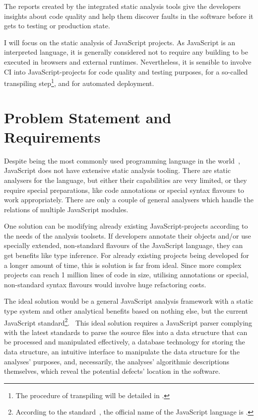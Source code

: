 The reports created by the integrated static analysis tools give the developers insights about code quality and help them discover faults in the software before it gets to testing or production state.

I will focus on the static analysis of JavaScript projects. As JavaScript is an interpreted language, it is generally considered not to require any building to be executed in browsers and external runtimes. Nevertheless, it is sensible to involve CI into JavaScript-projects for code quality and testing purposes, for a so-called transpiling step\footnote{The procedure of transpiling will be detailed in .}, and for automated deployment.


\section{Problem Statement and Requirements}

Despite being the most commonly used programming language in the world~\cite{javascriptstackoverflow}, JavaScript does not have extensive static analysis tooling. There are static analysers for the language, but either their capabilities are very limited, or they require special preparations, like code annotations or special syntax flavours to work appropriately. There are only a couple of general analysers which handle the relations of multiple JavaScript modules.

One solution can be modifying already existing JavaScript-projects according to the needs of the analysis toolsets. If developers annotate their objects and/or use specially extended, non-standard flavours of the JavaScript language, they can get benefits like type inference. For already existing projects being developed for a longer amount of time, this is solution is far from ideal. Since more complex projects can reach 1 million lines of code in size, utilising annotations or special, non-standard syntax flavours would involve huge refactoring costs.

The ideal solution would be a general JavaScript analysis framework with a static type system and other analytical benefits based on nothing else, but the current JavaScript standard\footnote{According to the standard~\cite{ecmascriptstandard}, the official name of the JavaScript language is \es.}.~\cite{ecmascriptstandard} This ideal solution requires a JavaScript parser complying with the latest \es standards to parse the source files into a data structure that can be processed and manipulated effectively, a database technology for storing the data structure, an intuitive interface to manipulate the data structure for the analyses' purposes, and, necessarily, the analyses' algorithmic descriptions themselves, which reveal the potential defects' location in the software.

